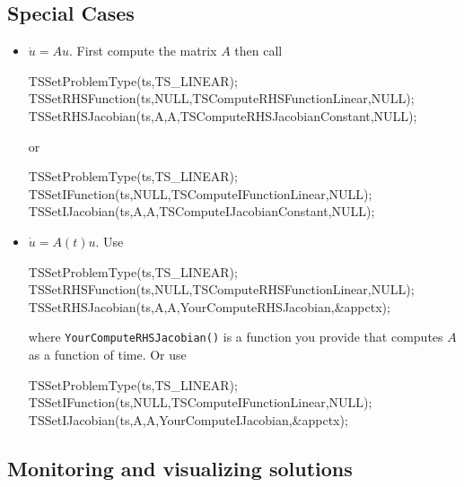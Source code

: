 \subsection{Special Cases}

\begin{itemize}
\item $ \dot{u} = A u.$ First compute the matrix $ A$ then call
\begin{tabbing}
  TSSetProblemType(ts,TS\_LINEAR);\\
  TSSetRHSFunction(ts,NULL,TSComputeRHSFunctionLinear,NULL); \\
  TSSetRHSJacobian(ts,A,A,TSComputeRHSJacobianConstant,NULL);
\end{tabbing}
or
\begin{tabbing}
  TSSetProblemType(ts,TS\_LINEAR);\\
  TSSetIFunction(ts,NULL,TSComputeIFunctionLinear,NULL); \\
  TSSetIJacobian(ts,A,A,TSComputeIJacobianConstant,NULL);
\end{tabbing}


\item $ \dot{u} = A(t) u.$ Use
\begin{tabbing}
  TSSetProblemType(ts,TS\_LINEAR);\\
  TSSetRHSFunction(ts,NULL,TSComputeRHSFunctionLinear,NULL); \\
  TSSetRHSJacobian(ts,A,A,YourComputeRHSJacobian,\&appctx);
\end{tabbing}
where {\tt YourComputeRHSJacobian()} is a function you provide that computes $A$ as a function of time. Or use
\begin{tabbing}
  TSSetProblemType(ts,TS\_LINEAR);\\
  TSSetIFunction(ts,NULL,TSComputeIFunctionLinear,NULL); \\
  TSSetIJacobian(ts,A,A,YourComputeIJacobian,\&appctx);
\end{tabbing}

\end{itemize}

\subsection{Monitoring and visualizing solutions}

